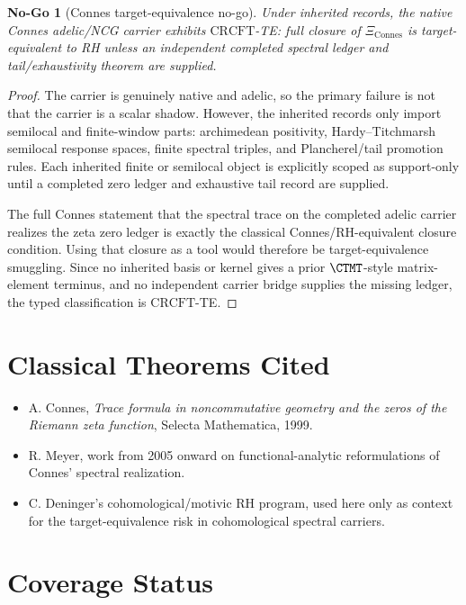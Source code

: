 \documentclass[11pt]{article}
\newtheorem{nogo}{No-Go}
\newcommand{\XiConnes}{\Xi_{\mathrm{Connes}}}
\newcommand{\CRCFT}{\mathrm{CRCFT}}
\begin{document}
\begin{nogo}[Connes target-equivalence no-go]
Under inherited records, the native Connes adelic/NCG carrier exhibits
\(\CRCFT\)-TE: full closure of \(\XiConnes\) is target-equivalent to RH unless
an independent completed spectral ledger and tail/exhaustivity theorem are
supplied.
\end{nogo}

\begin{proof}
The carrier is genuinely native and adelic, so the primary failure is not
that the carrier is a scalar shadow.  However, the inherited records only
import semilocal and finite-window parts: archimedean positivity,
Hardy--Titchmarsh semilocal response spaces, finite spectral triples, and
Plancherel/tail promotion rules.  Each inherited finite or semilocal object is
explicitly scoped as support-only until a completed zero ledger and exhaustive
tail record are supplied.

The full Connes statement that the spectral trace on the completed adelic
carrier realizes the zeta zero ledger is exactly the classical
Connes/RH-equivalent closure condition.  Using that closure as a tool would
therefore be target-equivalence smuggling.  Since no inherited basis or kernel
gives a prior \(\CTMT\)-style matrix-element terminus, and no independent
carrier bridge supplies the missing ledger, the typed classification is
\(\CRCFT\)-TE.
\end{proof}

\section*{Classical Theorems Cited}

\begin{itemize}
\item A. Connes, \emph{Trace formula in noncommutative geometry and the zeros
of the Riemann zeta function}, Selecta Mathematica, 1999.
\item R. Meyer, work from 2005 onward on functional-analytic reformulations of
Connes' spectral realization.
\item C. Deninger's cohomological/motivic RH program, used here only as
context for the target-equivalence risk in cohomological spectral carriers.
\end{itemize}

\section*{Coverage Status}
\end{document}
